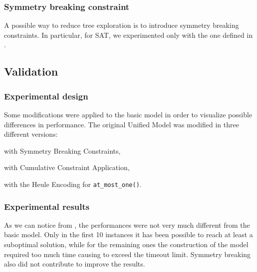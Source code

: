\subsubsection{Symmetry breaking constraint}

A possible way to reduce tree exploration is to introduce symmetry breaking constraints. In particular, for SAT, we experimented only with the one defined in .


\subsection{Validation}

\subsubsection{Experimental design}

Some modifications were applied to the basic model in order to visualize possible differences in performance.
The original Unified Model was modified in three different versions:
\begin{enumerate*}[label=(\roman*)]
    \item with Symmetry Breaking Constraints,
    \item with Cumulative Constraint Application,
    \item with the Heule Encoding for \texttt{at\_most\_one()}.
\end{enumerate*}


\subsubsection{Experimental results}

As we can notice from , the performances were not very much different from the basic model. Only in the first 10 instances it has been possible to reach at least a suboptimal solution, while for the remaining ones the construction of the model required too much time causing to exceed the timeout limit. Symmetry breaking also did not contribute to improve the results. 

